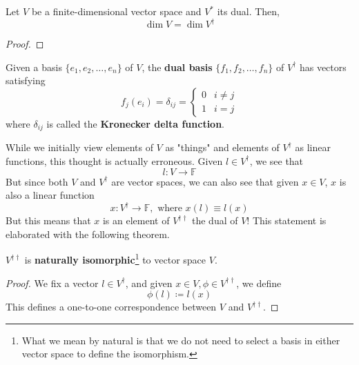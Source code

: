   \begin{theorem}
    Let $V$ be a finite-dimensional vector space and $V^\ast$ its dual. Then, 
    \begin{equation}
      \dim{V} = \dim{V^\dagger}
    \end{equation}
  \end{theorem}
  \begin{proof}
    
  \end{proof}

  \begin{definition}
    Given a basis $\{ e_1, e_2, \ldots, e_n\}$ of $V$, the \textbf{dual basis} $\{f_1, f_2, \ldots, f_n\}$ of $V^\dagger$ has vectors satisfying 
    \begin{equation}
      f_j (e_i) = \delta_{i j} = 
      \begin{cases}
      0 & i \neq j \\
      1 & i = j
      \end{cases}
    \end{equation}
    where $\delta_{i j}$ is called the \textbf{Kronecker delta function}. 
  \end{definition}

  While we initially view elements of $V$ as "things" and elements of $V^\dagger$ as linear functions, this thought is actually erroneous. Given $l \in V^\dagger$, we see that 
  \begin{equation}
    l: V \longrightarrow \mathbb{F}
  \end{equation}
  But since both $V$ and $V^\dagger$ are vector spaces, we can also see that given $x \in V$, $x$ is also a linear function 
  \begin{equation}
    x: V^\dagger \longrightarrow \mathbb{F}, \text{ where } x(l) \equiv l(x)
  \end{equation}
  But this means that $x$ is an element of $V^{\dagger\dagger}$ the dual of $V$! This statement is elaborated with the following theorem. 

  \begin{theorem}
    $V^{\dagger\dagger}$ is \textbf{naturally isomorphic}\footnote{What we mean by natural is that we do not need to select a basis in either vector space to define the isomorphism. } to vector space $V$. 
  \end{theorem}
  \begin{proof}
    We fix a vector $l \in V^\dagger$, and given $x \in V, \phi \in V^{\dagger\dagger}$, we define
    \begin{equation}
      \phi(l) \coloneqq l(x)
    \end{equation}
    This defines a one-to-one correspondence between $V$ and $V^{\dagger\dagger}$. 
  \end{proof}

